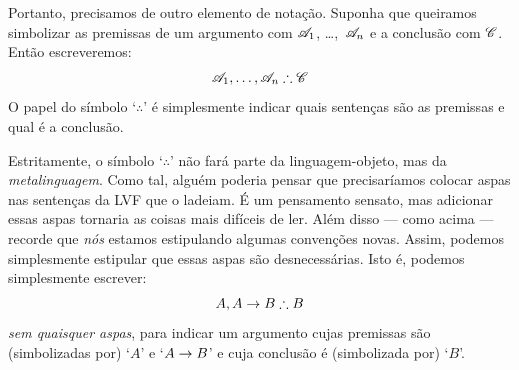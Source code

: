 

Portanto, precisamos de outro elemento de notação. Suponha que queiramos
simbolizar as premissas de um argumento com
$\mathscr{A}_1$, \dots,~$\mathscr{A}_n$ e a conclusão com $\mathscr{C}$. Então
escreveremos:
$$\metav{A}_1, \ldots, \metav{A}_n \therefore \metav{C}$$
O papel do símbolo `$\therefore$' é simplesmente indicar quais sentenças
são as premissas e qual é a conclusão.


Estritamente, o símbolo `$\therefore$' não fará parte da linguagem-objeto,
mas da \emph{metalinguagem}. Como tal, alguém poderia pensar que
precisaríamos colocar aspas nas sentenças da LVF que o ladeiam. É um
pensamento sensato, mas adicionar essas aspas tornaria as coisas mais
difíceis de ler. Além disso — como acima — recorde que \emph{nós} estamos
estipulando algumas convenções novas. Assim, podemos simplesmente estipular
que essas aspas são desnecessárias. Isto é, podemos simplesmente escrever:
$$A, A \eif B \therefore B$$
\emph{sem quaisquer aspas}, para indicar um argumento cujas premissas são
(simbolizadas por) `$A$' e `$A \rightarrow B$' e cuja conclusão é
(simbolizada por) `$B$'.
